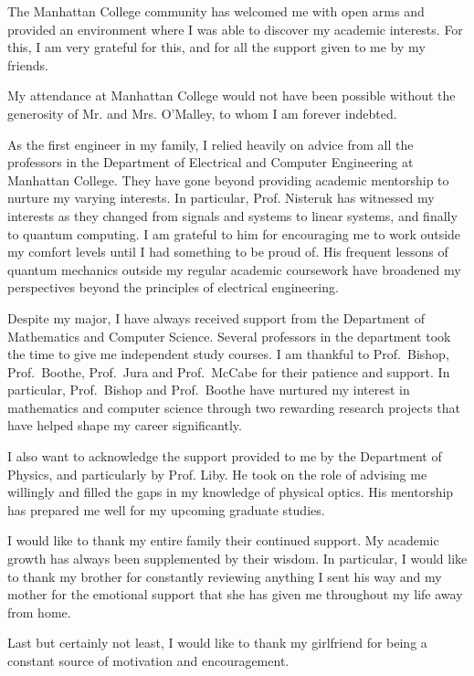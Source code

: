 The Manhattan College community has welcomed me with open arms and provided an environment where I was able to discover my academic interests. For this, I am very grateful for this, and for all the support given to me by my friends. 

My attendance at Manhattan College would not have been possible without the generosity of Mr. and Mrs. O'Malley, to whom I am forever indebted. 

As the first engineer in my family, I relied heavily on advice from all the professors in the Department of Electrical and Computer Engineering at Manhattan College. They have gone beyond providing academic mentorship to nurture my varying interests. In particular, Prof. Nisteruk has witnessed my interests as they changed from signals and systems to linear systems, and finally to quantum computing. I am grateful to him for encouraging me to work outside my comfort levels until I had something to be proud of. His frequent lessons of quantum mechanics outside my regular academic coursework have broadened my perspectives beyond the principles of electrical engineering.

Despite my major, I have always received support from the Department of Mathematics and Computer Science. Several professors in the department took the time to give me independent study courses. I am thankful to Prof.\ Bishop, Prof.\ Boothe, Prof.\ Jura and Prof.\ McCabe for their patience and support. In particular, Prof.\ Bishop and Prof.\ Boothe have nurtured my interest in mathematics and computer science through two rewarding research projects that have helped shape my career significantly.

I also want to acknowledge the support provided to me by the Department of Physics, and particularly by Prof. Liby. He took on the role of advising me willingly and filled the gaps in my knowledge of physical optics. His mentorship has prepared me well for my upcoming graduate studies.

I would like to thank my entire family their continued support. My academic growth has always been supplemented by their wisdom. In particular, I would like to thank my brother for constantly reviewing anything I sent his way and my mother for the emotional support that she has given me throughout my life away from home.

Last but certainly not least, I would like to thank my girlfriend for being a constant source of motivation and encouragement.
